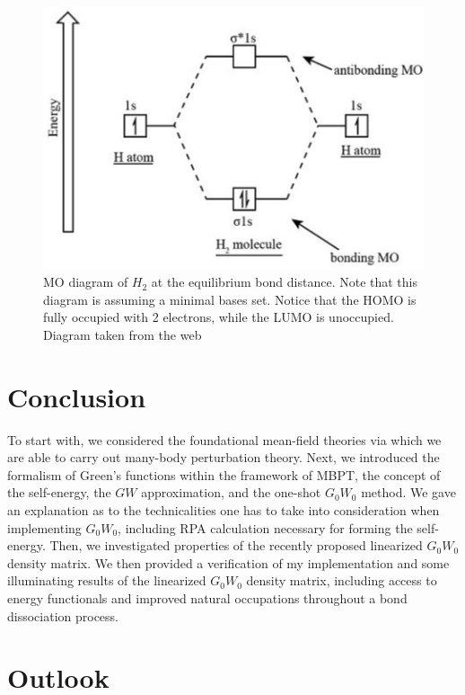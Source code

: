 \documentclass[12pt]{caltech_thesis}
\begin{document}
\begin{figure}[h]
    \centering
    \includegraphics[width=\textwidth]{h2_mo.png}
\caption{MO diagram of \(H_2\) at the equilibrium bond distance. Note that this diagram is assuming a minimal bases set. Notice that the HOMO is fully occupied with 2 electrons, while the LUMO is unoccupied. Diagram taken from the web \autocite{noauthor_molecular_nodate}}
\label{fig:h2_mo_diagram}
\end{figure}
\chapter{Conclusion}
To start with, we considered the foundational mean-field theories via which we are able to carry out many-body perturbation theory. Next, we introduced the formalism of Green's functions within the framework of MBPT, the concept of the self-energy, the $GW$ approximation, and the one-shot $G_0W_0$ method. We gave an explanation as to the technicalities one has to take into consideration when implementing $G_0W_0$, including RPA calculation necessary for forming the self-energy. Then, we investigated properties of the recently proposed linearized $G_0W_0$ density matrix. We then provided a verification of my implementation and some illuminating results of the linearized $G_0W_0$ density matrix, including access to energy functionals and improved natural occupations throughout a bond dissociation process.
\chapter{Outlook}

\printbibliography[heading=bibintoc]
\end{document}
